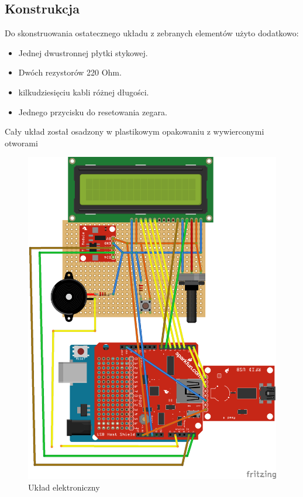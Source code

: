 \documentclass[declaration,shortabstract, mgr]{iithesis}
\begin{document}
\subsection{Konstrukcja}
\indent Do skonstruowania ostatecznego układu z zebranych elementów użyto dodatkowo:
\begin{itemize}
\item Jednej dwustronnej płytki stykowej.
\item Dwóch rezystorów 220 Ohm.
\item kilkudziesięciu kabli różnej długości.
\item Jednego przycisku do resetowania zegara.
\end{itemize}
\indent Cały układ został osadzony w plastikowym opakowaniu z wywierconymi otworami\\
\begin{figure}[h]
\caption{Układ elektroniczny}
\centering
\includegraphics{circuit.png}
\end{figure}
\end{document}
